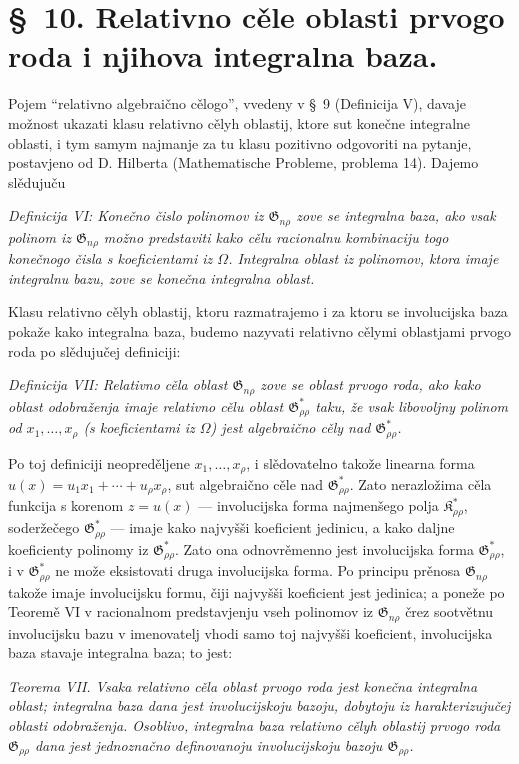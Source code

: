 \documentclass[11pt]{article}
\providecommand{\Kfield}{\mathfrak{K}}
\providecommand{\Gdom}{\mathfrak{G}}
\begin{document}
\section*{\S\ 10. Relativno cěle oblasti prvogo roda i njihova integralna baza.}

Pojem ``relativno algebraično cělogo'', vvedeny v \S\ 9 (Definicija V), davaje možnost ukazati klasu relativno cělyh oblastij, ktore sut konečne integralne oblasti, i tym samym najmanje za tu klasu pozitivno odgovoriti na pytanje, postavjeno od D. Hilberta (Mathematische Probleme, problema 14). Dajemo slědujuču

{\itshape Definicija VI: Konečno čislo polinomov iz $\Gdom_{n\rho}$ zove se integralna baza, ako vsak polinom iz $\Gdom_{n\rho}$ možno predstaviti kako cělu racionalnu kombinaciju togo konečnogo čisla s koeficientami iz $\Omega$. Integralna oblast iz polinomov, ktora imaje integralnu bazu, zove se konečna integralna oblast.}

Klasu relativno cělyh oblastij, ktoru razmatrajemo i za ktoru se involucijska baza pokaže kako integralna baza, budemo nazyvati relativno cělymi oblastjami prvogo roda po slědujučej definiciji:

{\itshape Definicija VII: Relativno cěla oblast $\Gdom_{n\rho}$ zove se oblast prvogo roda, ako kako oblast odobraženja imaje relativno cělu oblast $\Gdom^*_{\rho\rho}$ taku, že vsak libovoljny polinom od $x_1,\ldots,x_\rho$ (s koeficientami iz $\Omega$) jest algebraično cěly nad $\Gdom^*_{\rho\rho}$.}

Po toj definiciji neopreděljene $x_1,\ldots,x_\rho$, i slědovatelno takože linearna forma $u(x)=u_1x_1+\cdots+u_\rho x_\rho$, sut algebraično cěle nad $\Gdom^*_{\rho\rho}$. Zato nerazložima cěla funkcija s korenom $z=u(x)$ --- involucijska forma najmenšego polja $\Kfield^*_{\rho\rho}$, soderžečego $\Gdom^*_{\rho\rho}$ --- imaje kako najvyšši koeficient jedinicu, a kako daljne koeficienty polinomy iz $\Gdom^*_{\rho\rho}$. Zato ona odnovrěmenno jest involucijska forma $\Gdom^*_{\rho\rho}$, i v $\Gdom^*_{\rho\rho}$ ne može eksistovati druga involucijska forma. Po principu prěnosa $\Gdom_{n\rho}$ takože imaje involucijsku formu, čiji najvyšši koeficient jest jedinica; a poneže po Teoremě VI v racionalnom predstavjenju vseh polinomov iz $\Gdom_{n\rho}$ črez sootvětnu involucijsku bazu v imenovatelj vhodi samo toj najvyšši koeficient, involucijska baza stavaje integralna baza; to jest:

{\itshape Teorema VII. Vsaka relativno cěla oblast prvogo roda jest konečna integralna oblast; integralna baza dana jest involucijskoju bazoju, dobytoju iz harakterizujučej oblasti odobraženja. Osoblivo, integralna baza relativno cělyh oblastij prvogo roda $\Gdom_{\rho\rho}$ dana jest jednoznačno definovanoju involucijskoju bazoju $\Gdom_{\rho\rho}$.}
\end{document}
